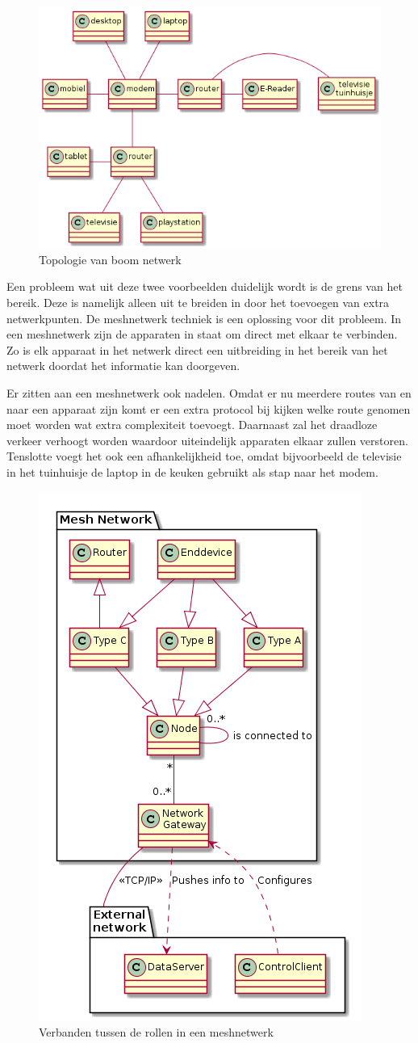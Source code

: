 \documentclass[a4paper, 11pt, oneside]{report}
\begin{document}
\begin{figure}[H]
	\begin{center}\includegraphics[width=.5\linewidth]{treeTopo}\end{center}
	\caption{Topologie van boom netwerk}
	\label{fig:toplogieboom}
\end{figure}

Een probleem wat uit deze twee voorbeelden duidelijk wordt is de grens van het bereik. 
Deze is namelijk alleen uit te breiden in door het toevoegen van extra netwerkpunten.
De meshnetwerk techniek is een oplossing voor dit probleem.
In een meshnetwerk zijn de apparaten in staat om direct met elkaar te verbinden. 
Zo is elk apparaat in het netwerk direct een uitbreiding in het bereik van het netwerk doordat het informatie kan doorgeven.

Er zitten aan een meshnetwerk ook nadelen.
Omdat er nu meerdere routes van en naar een apparaat zijn komt er een extra protocol bij kijken welke route genomen moet worden wat extra complexiteit toevoegt.
Daarnaast zal het draadloze verkeer verhoogt worden waardoor uiteindelijk apparaten elkaar zullen verstoren.
Tenslotte voegt het ook een afhankelijkheid toe, omdat bijvoorbeeld de televisie in het tuinhuisje de laptop in de keuken gebruikt als stap naar het modem.

\begin{figure}[H]
	\begin{center}\includegraphics[width=.3\linewidth]{meshclass}\end{center}
	\caption{Verbanden tussen de rollen in een meshnetwerk}
	\label{fig:meshrol}
\end{figure}
\end{document}
